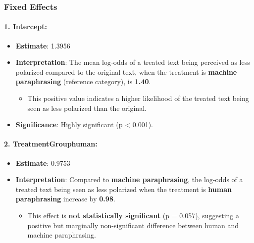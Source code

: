 \documentclass[
]{article}
\providecommand{\tightlist}{%
  \setlength{\itemsep}{0pt}\setlength{\parskip}{0pt}}
\begin{document}
\subsubsection{\texorpdfstring{\textbf{Fixed
Effects}}{Fixed Effects}}\label{fixed-effects}

\paragraph{\texorpdfstring{\textbf{1.
Intercept:}}{1. Intercept:}}\label{intercept}

\begin{itemize}
\tightlist
\item
  \textbf{Estimate}: 1.3956
\item
  \textbf{Interpretation}: The mean log-odds of a treated text being
  perceived as less polarized compared to the original text, when the
  treatment is \textbf{machine paraphrasing} (reference category), is
  \textbf{1.40}.

  \begin{itemize}
  \tightlist
  \item
    This positive value indicates a higher likelihood of the treated
    text being seen as less polarized than the original.
  \end{itemize}
\item
  \textbf{Significance}: Highly significant (p \textless{} 0.001).
\end{itemize}

\paragraph{\texorpdfstring{\textbf{2.
TreatmentGrouphuman:}}{2. TreatmentGrouphuman:}}\label{treatmentgrouphuman}

\begin{itemize}
\tightlist
\item
  \textbf{Estimate}: 0.9753
\item
  \textbf{Interpretation}: Compared to \textbf{machine paraphrasing},
  the log-odds of a treated text being seen as less polarized when the
  treatment is \textbf{human paraphrasing} increase by \textbf{0.98}.

  \begin{itemize}
  \tightlist
  \item
    This effect is \textbf{not statistically significant} (p = 0.057),
    suggesting a positive but marginally non-significant difference
    between human and machine paraphrasing.
  \end{itemize}
\end{itemize}
\end{document}
